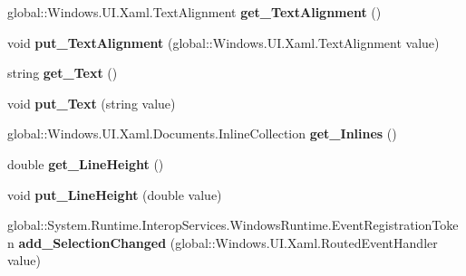 \begin{DoxyCompactItemize}
global\+::\+Windows.\+U\+I.\+Xaml.\+Text\+Alignment {\bfseries get\+\_\+\+Text\+Alignment} ()
\item 
\mbox{\label{class_windows_1_1_u_i_1_1_xaml_1_1_controls_1_1_text_block_a284f18b28cc583c43ba5d9187d561ef7}} 
void {\bfseries put\+\_\+\+Text\+Alignment} (global\+::\+Windows.\+U\+I.\+Xaml.\+Text\+Alignment value)
\item 
\mbox{\label{class_windows_1_1_u_i_1_1_xaml_1_1_controls_1_1_text_block_ae14b2c8d9da353fd995b80695d4caad0}} 
string {\bfseries get\+\_\+\+Text} ()
\item 
\mbox{\label{class_windows_1_1_u_i_1_1_xaml_1_1_controls_1_1_text_block_aa509823085f394729f1646a2acf564c4}} 
void {\bfseries put\+\_\+\+Text} (string value)
\item 
\mbox{\label{class_windows_1_1_u_i_1_1_xaml_1_1_controls_1_1_text_block_a6b2eb2ee12b7795ff5bfb850402083d6}} 
global\+::\+Windows.\+U\+I.\+Xaml.\+Documents.\+Inline\+Collection {\bfseries get\+\_\+\+Inlines} ()
\item 
\mbox{\label{class_windows_1_1_u_i_1_1_xaml_1_1_controls_1_1_text_block_a07976cf606fca5824f633f63d8da6936}} 
double {\bfseries get\+\_\+\+Line\+Height} ()
\item 
\mbox{\label{class_windows_1_1_u_i_1_1_xaml_1_1_controls_1_1_text_block_adbefe17b425b126a3b1d3598cf3b68f4}} 
void {\bfseries put\+\_\+\+Line\+Height} (double value)
\item 
\mbox{\label{class_windows_1_1_u_i_1_1_xaml_1_1_controls_1_1_text_block_af80d81341031136a13a2687720d46da0}} 
global\+::\+System.\+Runtime.\+Interop\+Services.\+Windows\+Runtime.\+Event\+Registration\+Token {\bfseries add\+\_\+\+Selection\+Changed} (global\+::\+Windows.\+U\+I.\+Xaml.\+Routed\+Event\+Handler value)
\item 
\mbox{\label{class_windows_1_1_u_i_1_1_xaml_1_1_controls_1_1_text_block_a0ec7a0aed82f465da9f07b1f0bb2f222}} 

\end{DoxyCompactItemize}
